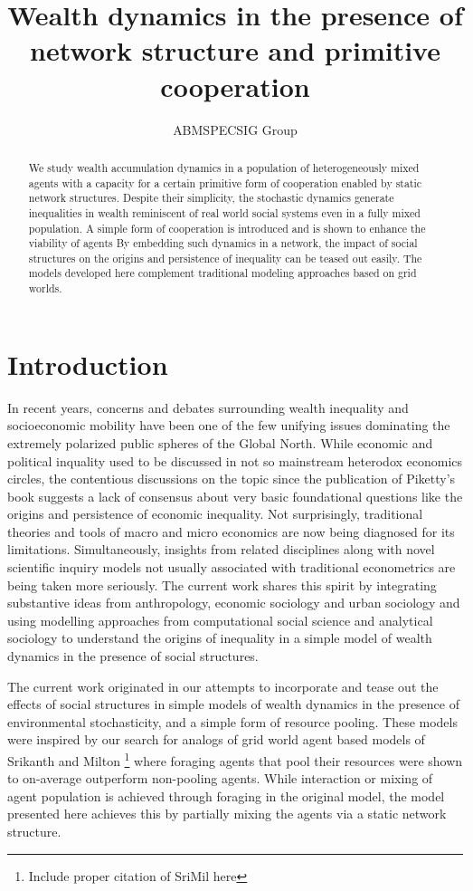 \documentclass{article}
\author{ABMSPECSIG Group}
\title{Wealth dynamics in the presence of network structure and primitive cooperation}
\begin{document}
\maketitle
\begin{abstract}
We study wealth accumulation dynamics in a population of heterogeneously mixed agents with a capacity for a certain primitive form of cooperation enabled by static network structures. Despite their simplicity, the stochastic dynamics generate inequalities in wealth reminiscent of real world social systems even in a fully mixed population. A simple form of cooperation is introduced and is shown to enhance the viability of agents By embedding such dynamics in a network, the impact of social structures on the origins and persistence of inequality can be teased out easily. The models developed here complement traditional modeling approaches based on grid worlds.   

\end{abstract}
\section{Introduction}
In recent years, concerns and debates surrounding wealth inequality and socioeconomic mobility have been one of the few unifying issues dominating the extremely polarized public spheres of the Global North. While economic and political inquality used to be discussed in not so mainstream heterodox economics circles, the contentious discussions on the topic since the publication of Piketty's book suggests a lack of consensus about very basic foundational questions like the origins and persistence of economic inequality. Not surprisingly, traditional theories and tools of macro and micro economics are now being diagnosed for its limitations. Simultaneously, insights from related disciplines along with novel scientific inquiry models not usually associated with traditional econometrics are being taken more seriously. The current work shares this spirit by integrating substantive ideas from anthropology, economic sociology and urban sociology and using modelling approaches from computational social science and analytical sociology to understand the origins of inequality in a simple model of wealth dynamics in the presence of social structures.    

The current work originated in our attempts to incorporate and tease out the effects of social structures in simple models of wealth dynamics in the presence of environmental stochasticity, and a simple form of resource pooling. These models were inspired by our search for analogs of grid world agent based models of Srikanth and Milton \footnote{Include proper citation of SriMil here} where foraging agents that pool their resources were shown to on-average outperform non-pooling agents. While interaction or mixing of agent population is achieved through foraging in the original model, the model presented here achieves this by partially mixing the agents via a static network structure. 
\end{document}
